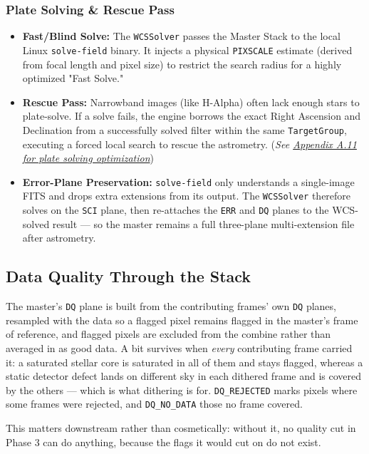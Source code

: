 \documentclass[11pt,a4paper]{article}
\begin{document}
\subsubsection{Plate Solving \& Rescue Pass}
\begin{itemize}[leftmargin=*]
    \item \textbf{Fast/Blind Solve:} The \texttt{WCSSolver} passes the Master Stack to the local Linux \texttt{solve-field} binary. It injects a physical \texttt{PIXSCALE} estimate (derived from focal length and pixel size) to restrict the search radius for a highly optimized "Fast Solve."
    \item \textbf{Rescue Pass:} Narrowband images (like H-Alpha) often lack enough stars to plate-solve. If a solve fails, the engine borrows the exact Right Ascension and Declination from a successfully solved filter within the same \texttt{TargetGroup}, executing a forced local search to rescue the astrometry. (\textit{See \hyperref[app:wcs]{Appendix A.11 for plate solving optimization}})
    \item \textbf{Error-Plane Preservation:} \texttt{solve-field} only understands a single-image FITS and drops extra extensions from its output. The \texttt{WCSSolver} therefore solves on the \texttt{SCI} plane, then re-attaches the \texttt{ERR} and \texttt{DQ} planes to the WCS-solved result --- so the master remains a full three-plane multi-extension file after astrometry.
\end{itemize}


\subsection{Data Quality Through the Stack}
The master's \texttt{DQ} plane is built from the contributing frames' own
\texttt{DQ} planes, resampled with the data so a flagged pixel remains flagged
in the master's frame of reference, and flagged pixels are excluded from the
combine rather than averaged in as good data. A bit survives when \emph{every}
contributing frame carried it: a saturated stellar core is saturated in all of
them and stays flagged, whereas a static detector defect lands on different sky
in each dithered frame and is covered by the others --- which is what dithering
is for. \texttt{DQ\_REJECTED} marks pixels where some frames were rejected, and
\texttt{DQ\_NO\_DATA} those no frame covered.

This matters downstream rather than cosmetically: without it, no quality cut in
Phase 3 can do anything, because the flags it would cut on do not exist.
\end{document}
